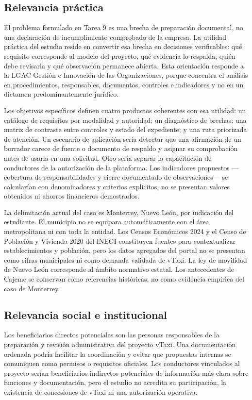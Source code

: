{\subsection{Relevancia práctica}
El problema formulado en Tarea 9 es una brecha de preparación documental, no una declaración de incumplimiento comprobado de la empresa. La utilidad práctica del estudio reside en convertir esa brecha en decisiones verificables: qué requisito corresponde al modelo del proyecto, qué evidencia lo respalda, quién debe revisarla y qué observación permanece abierta. Esta orientación responde a la LGAC Gestión e Innovación de las Organizaciones, porque concentra el análisis en procedimientos, responsables, documentos, controles e indicadores y no en un dictamen predominantemente jurídico.


Los objetivos específicos definen cuatro productos coherentes con esa utilidad: un catálogo de requisitos por modalidad y autoridad; un diagnóstico de brechas; una matriz de contraste entre controles y estado del expediente; y una ruta priorizada de atención. Un escenario de aplicación sería detectar que una afirmación de un borrador carece de fuente o documento de respaldo y asignar su comprobación antes de usarla en una solicitud. Otro sería separar la capacitación de conductores de la autorización de la plataforma. Los indicadores propuestos —cobertura de responsabilidades y cierre documentado de observaciones— se calcularían con denominadores y criterios explícitos; no se presentan valores obtenidos ni ahorros financieros demostrados.


La delimitación actual del caso es Monterrey, Nuevo León, por indicación del estudiante. El municipio no se equipara automáticamente con el área metropolitana ni con toda la entidad. Los Censos Económicos 2024 y el Censo de Población y Vivienda 2020 del INEGI constituyen fuentes para contextualizar establecimientos y población, pero los datos agregados del portal no se presentan como cifras municipales ni como demanda validada de vTaxi. La ley de movilidad de Nuevo León corresponde al ámbito normativo estatal. Los antecedentes de Cajeme se conservan como referencias históricas, no como evidencia empírica del caso de Monterrey.


\subsection{Relevancia social e institucional}
Los beneficiarios directos potenciales son las personas responsables de la preparación y revisión administrativa del proyecto vTaxi. Una documentación ordenada podría facilitar la coordinación y evitar que propuestas internas se comuniquen como permisos o requisitos oficiales. Los conductores vinculados al proyecto serían beneficiarios indirectos potenciales de información más clara sobre funciones y documentación, pero el estudio no acredita su participación, la existencia de concesiones de vTaxi ni una autorización operativa.


}
